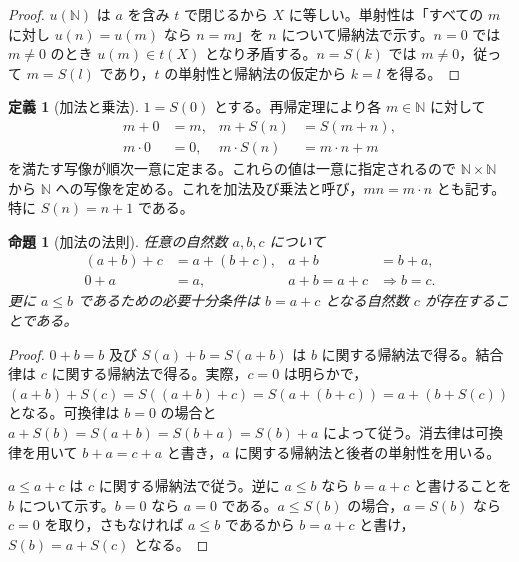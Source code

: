 \documentclass[a5paper,10pt,dvipdfmx]{jsarticle}
\theoremstyle{definition}
\newtheorem{defn}[ruledef]{定義}
\theoremstyle{plain}
\newtheorem{prop}[ruledef]{命題}
\newcommand{\impc}{\Longrightarrow}
\begin{document}
\begin{proof}
$u(\mathbb N)$ は $a$ を含み $t$ で閉じるから $X$ に等しい。単射性は「すべての $m$ に対し $u(n)=u(m)$ なら $n=m$」を $n$ について帰納法で示す。$n=0$ では $m\ne0$ のとき $u(m)\in t(X)$ となり矛盾する。$n=S(k)$ では $m\ne0$，従って $m=S(l)$ であり，$t$ の単射性と帰納法の仮定から $k=l$ を得る。
\end{proof}
\begin{defn}[加法と乗法]\label{k107}
$1=S(0)$ とする。再帰定理により各 $m\in\mathbb N$ に対して
\begin{align*}
 m+0&=m,&m+S(n)&=S(m+n),\\
 m\cdot0&=0,&m\cdot S(n)&=m\cdot n+m
\end{align*}
を満たす写像が順次一意に定まる。これらの値は一意に指定されるので $\mathbb N\times\mathbb N$ から $\mathbb N$ への写像を定める。これを加法及び乗法と呼び，$mn=m\cdot n$ とも記す。特に $S(n)=n+1$ である。
\end{defn}
\begin{prop}[加法の法則]\label{k108}
任意の自然数 $a,b,c$ について
\begin{align*}
 (a+b)+c&=a+(b+c),&a+b&=b+a,\\
 0+a&=a,&a+b=a+c&\impc b=c.
\end{align*}
更に $a\leq b$ であるための必要十分条件は $b=a+c$ となる自然数 $c$ が存在することである。
\end{prop}
\begin{proof}
$0+b=b$ 及び $S(a)+b=S(a+b)$ は $b$ に関する帰納法で得る。結合律は $c$ に関する帰納法で得る。実際，$c=0$ は明らかで，$(a+b)+S(c)=S((a+b)+c)=S(a+(b+c))=a+(b+S(c))$ となる。可換律は $b=0$ の場合と $a+S(b)=S(a+b)=S(b+a)=S(b)+a$ によって従う。消去律は可換律を用いて $b+a=c+a$ と書き，$a$ に関する帰納法と後者の単射性を用いる。

$a\leq a+c$ は $c$ に関する帰納法で従う。逆に $a\leq b$ なら $b=a+c$ と書けることを $b$ について示す。$b=0$ なら $a=0$ である。$a\leq S(b)$ の場合，$a=S(b)$ なら $c=0$ を取り，さもなければ $a\leq b$ であるから $b=a+c$ と書け，$S(b)=a+S(c)$ となる。
\end{proof}
\end{document}

